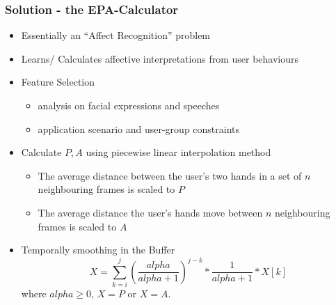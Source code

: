 \documentclass{beamer}
\begin{document}
\begin{frame}
\frametitle{Solution - the EPA-Calculator}
\begin{itemize}
\item Essentially an ``Affect Recognition'' problem
\item Learns/ Calculates affective interpretations from user behaviours
\pause \item Feature Selection
\begin{itemize}
\item analysis on facial expressions and speeches
\item application scenario and user-group constraints
\end{itemize}
\pause \item Calculate $P,A$ using piecewise linear interpolation method
\begin{itemize}
\item The average distance between the user's two hands in a set of $n$ neighbouring frames is scaled to $P$
\item The average distance the user's hands move between $n$ neighbouring frames is scaled to $A$
\end{itemize}
\pause \item Temporally smoothing in the Buffer
\begin{equation}
X=\sum_{k=i}^{j}(\dfrac{alpha}{alpha+1})^{j-k}*\dfrac{1}{alpha+1}*X[k]
\end{equation}
where $alpha \geq 0$, $X=P$ or $X=A$.
\end{itemize}
\end{frame}
\end{document}
